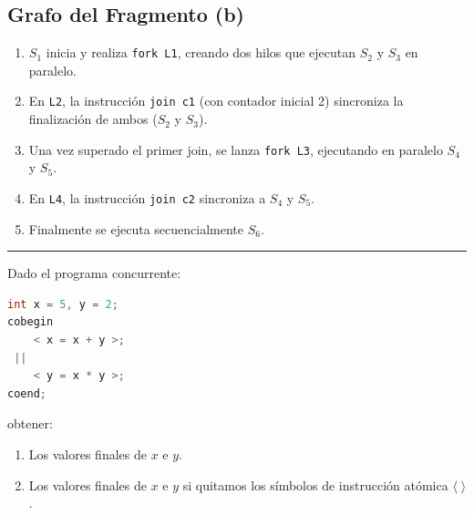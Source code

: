 \documentclass[11pt,a4paper,twoside,openright]{report}
\begin{document}
\begin{solucion}
\subsection*{Grafo del Fragmento (b)}
\begin{enumerate}
    \item $S_1$ inicia y realiza \texttt{fork L1}, creando dos hilos que ejecutan $S_2$ y $S_3$ en paralelo.
    \item En \texttt{L2}, la instrucción \texttt{join c1} (con contador inicial 2) sincroniza la finalización de ambos ($S_2$ y $S_3$).
    \item Una vez superado el primer join, se lanza \texttt{fork L3}, ejecutando en paralelo $S_4$ y $S_5$.
    \item En \texttt{L4}, la instrucción \texttt{join c2} sincroniza a $S_4$ y $S_5$.
    \item Finalmente se ejecuta secuencialmente $S_6$.
\end{enumerate}

\begin{center}
\end{center}
\end{solucion}

\vspace{15pt}
\hrule
\vspace{15pt}

\begin{ejercicio}
Dado el programa concurrente:
\begin{lstlisting}[language=C++]
int x = 5, y = 2;
cobegin
    < x = x + y >;
 ||
    < y = x * y >;
coend;
\end{lstlisting}
obtener:
\begin{enumerate}[label=(\alph*),leftmargin=*]
    \item Los valores finales de $x$ e $y$.
    \item Los valores finales de $x$ e $y$ si quitamos los símbolos de instrucción atómica $\langle \; \rangle$.
\end{enumerate}
\end{ejercicio}
\end{document}
